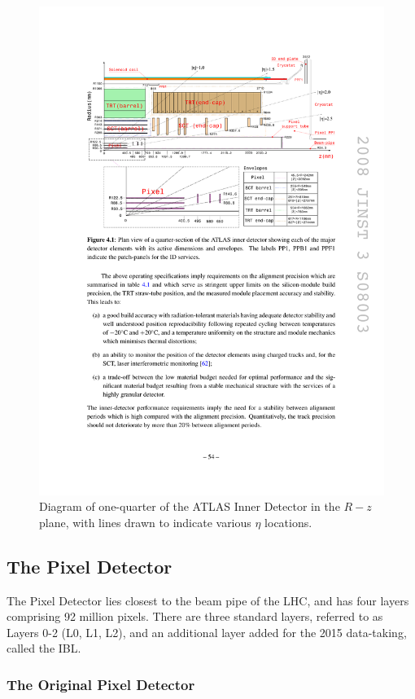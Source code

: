 \begin{centering}
\begin{figure}[bth]
\myfloatalign
\includegraphics[width=.90\linewidth]{figures/atlas/ideta.pdf}
\caption{Diagram of one-quarter of the \ac{ATLAS} Inner Detector in the $R-z$ plane, with lines drawn to indicate various $\eta$ locations.}
\label{fig:IDeta}
\end{figure}
\end{centering}

\subsection{The Pixel Detector}

The Pixel Detector lies closest to the beam pipe of the \ac{LHC}, and has four layers comprising 92 million pixels. There are three standard layers, referred to as Layers 0-2 (L0, L1, L2), and an additional layer added for the 2015 data-taking, called the \acf{IBL}. 

\subsubsection{The Original Pixel Detector}


